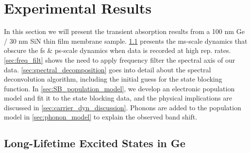 

%

%


\section{Experimental Results}

In this section we will present the transient absorption results from a 100 nm Ge / 30 nm SiN thin film membrane sample. \cref{sec:ms_dynamics} presents the ms-scale dynamics that obscure the fs \& ps-scale dynamics when data is recorded at high rep. rates. \cref{sec:freq_filt} shows the need to apply frequency filter the spectral axis of our data. \cref{sec:spectral_decomposition} goes into detail about the spectral deconvolution algorithm, including the initial guess for the state blocking function. In \cref{sec:SB_population_model}, we develop an electronic population model and fit it to the state blocking data, and the physical implications are discussed in \cref{sec:carrier_dyn_discussion}. Phonons are added to the population model in \cref{sec:phonon_model} to explain the observed band shift.

\subsection{Long-Lifetime Excited States in Ge}
\label{sec:ms_dynamics}


